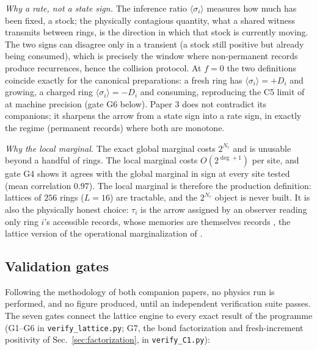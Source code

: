 \documentclass[11pt]{article}
\begin{document}
\emph{Why a rate, not a state sign.} The inference ratio
$\langle\sigma_i\rangle$ measures how much has been fixed, a stock; the
physically contagious quantity, what a shared witness transmits between
rings, is the direction in which that stock is currently moving. The two
signs can disagree only in a transient (a stock still positive but already
being consumed), which is precisely the window where non-permanent records
produce recurrences, hence the collision protocol. At $f = 0$ the two
definitions coincide exactly for the canonical preparations: a fresh ring
has $\langle\sigma_i\rangle = +D_i$ and growing, a charged ring
$\langle\sigma_i\rangle = -D_i$ and consuming, reproducing the C5 limit of
\cite{p2} at machine precision (gate G6 below). Paper 3 does not contradict
its companions; it sharpens the arrow from a state sign into a rate sign, in
exactly the regime (permanent records) where both are monotone.

\emph{Why the local marginal.} The exact global marginal costs $2^{N_r}$ and
is unusable beyond a handful of rings. The local marginal costs
$O(2^{\deg+1})$ per site, and gate G4 shows it agrees with the global
marginal in sign at every site tested (mean correlation $0.97$). The local
marginal is therefore the production definition: lattices of $256$ rings
($L=16$) are tractable, and the $2^{N_r}$ object is never built. It is also
the physically honest choice: $\tau_i$ is the arrow assigned by an observer
reading only ring $i$'s accessible records, whose memories are themselves
records \cite{mlodinow}, the lattice version of the
operational marginalization of \cite{p2}.

\subsection{Validation gates}
\label{sec:gates}

Following the methodology of both companion papers, no physics run is
performed, and no figure produced, until an independent verification suite
passes. The seven gates connect the lattice engine to every exact result of
the programme (G1--G6 in \texttt{verify\_lattice.py}; G7, the bond
factorization and fresh-increment positivity of Sec.~\ref{sec:factorization},
in \texttt{verify\_C1.py}):
\end{document}
